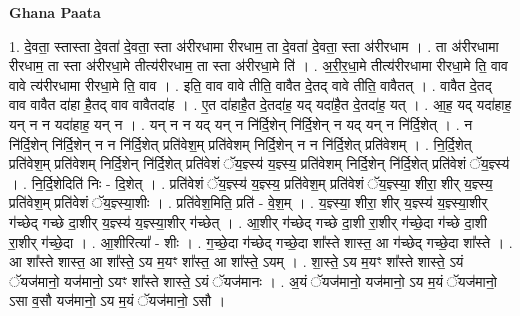 \documentclass[17pt]{extarticle}
\begin{document}
\textbf{Ghana Paata } \newline

1. दे॒वता॒ स्तास्ता दे॒वता॑ दे॒वता॒ स्ता अ॑रीरधामा रीरधाम॒ ता दे॒वता॑ दे॒वता॒ स्ता अ॑रीरधाम । . ता अ॑रीरधामा रीरधाम॒ ता स्ता अ॑रीरधा॒मे तीत्य॑रीरधाम॒ ता स्ता अ॑रीरधा॒मे ति॑ । . अ॒री॒र॒धा॒मे तीत्य॑रीरधामा रीरधा॒मे ति॒ वाव वावे त्य॑रीरधामा रीरधा॒मे ति॒ वाव । . इति॒ वाव वावे तीति॒ वावैत दे॒तद् वावे तीति॒ वावैतत् । . वावैत दे॒तद् वाव वावैत दा॑हा है॒तद् वाव वावैतदा॑ह । . ए॒त दा॑हाहै॒त दे॒तदा॑ह॒ यद् यदा॑है॒त दे॒तदा॑ह॒ यत् । . आ॒ह॒ यद् यदा॑हाह॒ यन् न न यदा॑हाह॒ यन् न । . यन् न न यद् यन् न नि॑र्दि॒शेन् नि॑र्दि॒शेन् न यद् यन् न नि॑र्दि॒शेत् । . न नि॑र्दि॒शेन् नि॑र्दि॒शेन् न न नि॑र्दि॒शेत् प्रति॑वेश॒म् प्रति॑वेशम् निर्दि॒शेन् न न नि॑र्दि॒शेत् प्रति॑वेशम् । . नि॒र्दि॒शेत् प्रति॑वेश॒म् प्रति॑वेशम् निर्दि॒शेन् नि॑र्दि॒शेत् प्रति॑वेशं ॅय॒ज्ञ्स्य॑ य॒ज्ञ्स्य॒ प्रति॑वेशम् निर्दि॒शेन् नि॑र्दि॒शेत् प्रति॑वेशं ॅय॒ज्ञ्स्य॑ । . नि॒र्दि॒शेदिति॑ निः - दि॒शेत् । . प्रति॑वेशं ॅय॒ज्ञ्स्य॑ य॒ज्ञ्स्य॒ प्रति॑वेश॒म् प्रति॑वेशं ॅय॒ज्ञ्स्या॒ शीरा॒ शीर् य॒ज्ञ्स्य॒ प्रति॑वेश॒म् प्रति॑वेशं ॅय॒ज्ञ्स्या॒शीः । . प्रति॑वेश॒मिति॒ प्रति॑ - वे॒श॒म् । . य॒ज्ञ्स्या॒ शीरा॒ शीर् य॒ज्ञ्स्य॑ य॒ज्ञ्स्या॒शीर् ग॑च्छेद् गच्छे दा॒शीर् य॒ज्ञ्स्य॑ य॒ज्ञ्स्या॒शीर् ग॑च्छेत् । . आ॒शीर् ग॑च्छेद् गच्छे दा॒शी रा॒शीर् ग॑च्छे॒दा ग॑च्छे दा॒शी रा॒शीर् ग॑च्छे॒दा । . आ॒शीरित्या᳚ - शीः । . ग॒च्छे॒दा ग॑च्छेद् गच्छे॒दा शा᳚स्ते शास्त॒ आ ग॑च्छेद् गच्छे॒दा शा᳚स्ते । . आ शा᳚स्ते शास्त॒ आ शा᳚स्ते॒ ऽय म॒यꣳ शा᳚स्त॒ आ शा᳚स्ते॒ ऽयम् । . शा॒स्ते॒ ऽय म॒यꣳ शा᳚स्ते शास्ते॒ ऽयं ॅयज॑मानो॒ यज॑मानो॒ ऽयꣳ शा᳚स्ते शास्ते॒ ऽयं ॅयज॑मानः । . अ॒यं ॅयज॑मानो॒ यज॑मानो॒ ऽय म॒यं ॅयज॑मानो॒ ऽसा व॒सौ यज॑मानो॒ ऽय म॒यं ॅयज॑मानो॒ ऽसौ । \newline
\end{document}
